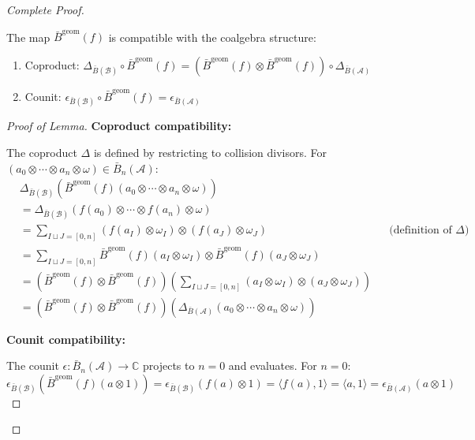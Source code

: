 \begin{proof}[Complete Proof]
\begin{lemma}\label{lem:bar-induced-coalgebra}
The map $\bar{B}^{\text{geom}}(f)$ is compatible with the coalgebra structure:
\begin{enumerate}
\item Coproduct: $\Delta_{\bar{B}(\mathcal{B})} \circ \bar{B}^{\text{geom}}(f) = (\bar{B}^{\text{geom}}(f) \otimes \bar{B}^{\text{geom}}(f)) \circ \Delta_{\bar{B}(\mathcal{A})}$
\item Counit: $\epsilon_{\bar{B}(\mathcal{B})} \circ \bar{B}^{\text{geom}}(f) = \epsilon_{\bar{B}(\mathcal{A})}$
\end{enumerate}
\end{lemma}

\begin{proof}[Proof of Lemma]
\textbf{Coproduct compatibility:}

The coproduct $\Delta$ is defined by restricting to collision divisors. For $(a_0 \otimes \cdots \otimes a_n \otimes \omega) \in \bar{B}_n(\mathcal{A})$:
\begin{align*}
&\Delta_{\bar{B}(\mathcal{B})}(\bar{B}^{\text{geom}}(f)(a_0 \otimes \cdots \otimes a_n \otimes \omega)) \\
&= \Delta_{\bar{B}(\mathcal{B})}(f(a_0) \otimes \cdots \otimes f(a_n) \otimes \omega) \\
&= \sum_{I \sqcup J = [0,n]} (f(a_I) \otimes \omega_I) \otimes (f(a_J) \otimes \omega_J) && \text{(definition of } \Delta) \\
&= \sum_{I \sqcup J = [0,n]} \bar{B}^{\text{geom}}(f)(a_I \otimes \omega_I) \otimes \bar{B}^{\text{geom}}(f)(a_J \otimes \omega_J) \\
&= (\bar{B}^{\text{geom}}(f) \otimes \bar{B}^{\text{geom}}(f))\left(\sum_{I \sqcup J = [0,n]} (a_I \otimes \omega_I) \otimes (a_J \otimes \omega_J)\right) \\
&= (\bar{B}^{\text{geom}}(f) \otimes \bar{B}^{\text{geom}}(f))(\Delta_{\bar{B}(\mathcal{A})}(a_0 \otimes \cdots \otimes a_n \otimes \omega))
\end{align*}

\textbf{Counit compatibility:}

The counit $\epsilon: \bar{B}_n(\mathcal{A}) \to \mathbb{C}$ projects to $n=0$ and evaluates. For $n=0$:
$$\epsilon_{\bar{B}(\mathcal{B})}(\bar{B}^{\text{geom}}(f)(a \otimes 1)) = \epsilon_{\bar{B}(\mathcal{B})}(f(a) \otimes 1) = \langle f(a), 1 \rangle = \langle a, 1 \rangle = \epsilon_{\bar{B}(\mathcal{A})}(a \otimes 1)$$


\end{proof}
\end{proof}
